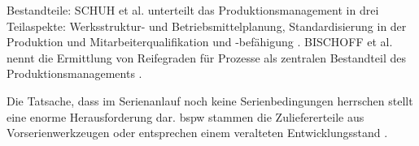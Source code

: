 Bestandteile: 
SCHUH et al. unterteilt das Produktionsmanagement in drei Teilaspekte: Werksstruktur- und Betriebsmittelplanung, Standardisierung in der Produktion und Mitarbeiterqualifikation und -befähigung \cite[177]{Schuh2008}. %
BISCHOFF et al. nennt die Ermittlung von Reifegraden für Prozesse als zentralen Bestandteil des Produktionsmanagements \cite[20]{Bischoff2007}. 

Die Tatsache, dass im Serienanlauf noch keine Serienbedingungen herrschen stellt eine enorme Herausforderung dar. \Gls{bspw} stammen die Zuliefererteile aus Vorserienwerkzeugen oder entsprechen einem veralteten Entwicklungsstand \cite[21]{Kuhn2002}. 


% 
% 
% 


